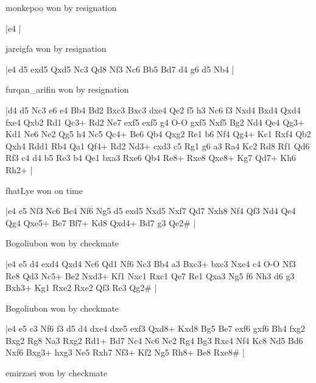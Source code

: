 \showboard

monkepoo won by resignation

\makegametitle
|e4  |

\showboard

jareigfa won by resignation

\makegametitle
|e4 d5 exd5 Qxd5 Nc3 Qd8 Nf3 Nc6 Bb5 Bd7 d4 g6 d5 Nb4  |

\showboard

furqan\_arifin won by resignation

\makegametitle
|d4 d5 Nc3 e6 e4 Bb4 Bd2 Bxc3 Bxc3 dxe4 Qe2 f5 h3 Nc6 f3 Nxd4 Bxd4 Qxd4 fxe4 Qxb2 Rd1 Qc3+ Rd2 Ne7 exf5 exf5 g4 O-O gxf5 Nxf5 Bg2 Nd4 Qe4 Qg3+ Kd1 Ne6 Ne2 Qg5 h4 Nc5 Qc4+ Be6 Qb4 Qxg2 Re1 b6 Nf4 Qg4+ Kc1 Rxf4 Qb2 Qxh4 Rdd1 Rb4 Qa1 Qf4+ Rd2 Nd3+ cxd3 c5 Rg1 g6 a3 Ra4 Kc2 Rd8 Rf1 Qd6 Rf3 c4 d4 b5 Re3 b4 Qe1 bxa3 Rxe6 Qb4 Re8+ Rxe8 Qxe8+ Kg7 Qd7+ Kh6 Rh2+  |

\showboard

fhatLye won on time

\makegametitle
|e4 e5 Nf3 Nc6 Bc4 Nf6 Ng5 d5 exd5 Nxd5 Nxf7 Qd7 Nxh8 Nf4 Qf3 Nd4 Qe4 Qg4 Qxe5+ Be7 Bf7+ Kd8 Qxd4+ Bd7 g3 Qe2\#  |

\showboard

Bogoliubon won by checkmate

\makegametitle
|e4 e5 d4 exd4 Qxd4 Nc6 Qd1 Nf6 Nc3 Bb4 a3 Bxc3+ bxc3 Nxe4 c4 O-O Nf3 Re8 Qd3 Nc5+ Be2 Nxd3+ Kf1 Nxc1 Rxc1 Qe7 Re1 Qxa3 Ng5 f6 Nh3 d6 g3 Bxh3+ Kg1 Rxe2 Rxe2 Qf3 Re3 Qg2\#  |

\showboard

Bogoliubon won by checkmate

\makegametitle
|e4 e5 c3 Nf6 f3 d5 d4 dxe4 dxe5 exf3 Qxd8+ Kxd8 Bg5 Be7 exf6 gxf6 Bh4 fxg2 Bxg2 Rg8 Na3 Rxg2 Rd1+ Bd7 Nc4 Nc6 Ne2 Rg4 Bg3 Rxc4 Nf4 Kc8 Nd5 Bd6 Nxf6 Bxg3+ hxg3 Ne5 Rxh7 Nf3+ Kf2 Ng5 Rh8+ Be8 Rxe8\#  |

\showboard

emirzaei won by checkmate

